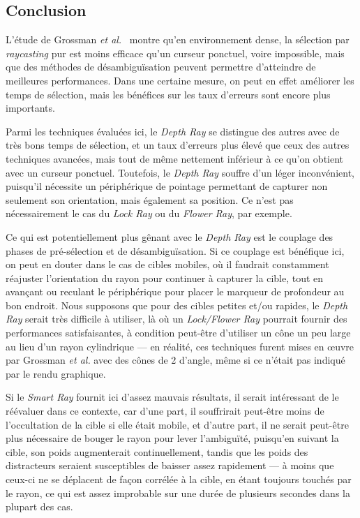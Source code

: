 	\subsection{Conclusion}
	L'étude de Grossman \emph{et al.}~\cite{grossman2006design} montre qu'en environnement dense, la sélection par \emph{raycasting} pur est moins efficace qu'un curseur ponctuel, voire impossible, mais que des méthodes de désambiguïsation peuvent permettre d'atteindre de meilleures performances. Dans une certaine mesure, on peut en effet améliorer les temps de sélection, mais les bénéfices sur les taux d'erreurs sont encore plus importants.
	
	Parmi les techniques évaluées ici, le \emph{Depth Ray} se distingue des autres avec de très bons temps de sélection, et un taux d'erreurs plus élevé que ceux des autres techniques avancées, mais tout de même nettement inférieur à ce qu'on obtient avec un curseur ponctuel. Toutefois, le \emph{Depth Ray} souffre d'un léger inconvénient, puisqu'il nécessite un périphérique de pointage permettant de capturer non seulement son orientation, mais également sa position. Ce n'est pas nécessairement le cas du \emph{Lock Ray} ou du \emph{Flower Ray}, par exemple.
	
	Ce qui est potentiellement plus gênant avec le \emph{Depth Ray} est le couplage des phases de pré-sélection et de désambiguïsation. Si ce couplage est bénéfique ici, on peut en douter dans le cas de cibles mobiles, où il faudrait constamment réajuster l'orientation du rayon pour continuer à \og capturer \fg{} la cible, tout en avançant ou reculant le périphérique pour placer le marqueur de profondeur au bon endroit. Nous supposons que pour des cibles petites et/ou rapides, le \emph{Depth Ray} serait très difficile à utiliser, là où un \emph{Lock/Flower Ray} pourrait fournir des performances satisfaisantes, à condition peut-être d'utiliser un cône un peu large au lieu d'un rayon cylindrique --- en réalité, ces techniques furent mises en \oe{}uvre par Grossman \emph{et al.} avec des cônes de 2\textdegree{} d'angle, même si ce n'était pas indiqué par le rendu graphique.
	
	Si le \emph{Smart Ray} fournit ici d'assez mauvais résultats, il serait intéressant de le réévaluer dans ce contexte, car d'une part, il souffrirait peut-être moins de l'occultation de la cible si elle était mobile, et d'autre part, il ne serait peut-être plus nécessaire de bouger le rayon pour lever l'ambiguïté, puisqu'en suivant la cible, son poids augmenterait continuellement, tandis que les poids des distracteurs seraient susceptibles de baisser assez rapidement --- à moins que ceux-ci ne se déplacent de façon corrélée à la cible, en étant toujours touchés par le rayon, ce qui est assez improbable sur une durée de plusieurs secondes dans la plupart des cas.
	
